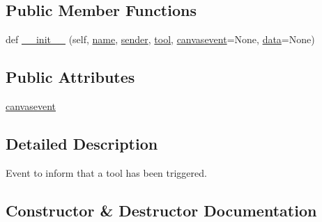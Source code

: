 \subsection*{Public Member Functions}
\begin{DoxyCompactItemize}
\item 
def \hyperlink{classmatplotlib_1_1backend__managers_1_1ToolTriggerEvent_a3457ac502525a7afa259c1ef144efe81}{\+\_\+\+\_\+init\+\_\+\+\_\+} (self, \hyperlink{classmatplotlib_1_1backend__managers_1_1ToolEvent_a911e0e0aa3846d264fcf064a3b7b887d}{name}, \hyperlink{classmatplotlib_1_1backend__managers_1_1ToolEvent_a00635a362e6b1ad9e98be07804cb77a0}{sender}, \hyperlink{classmatplotlib_1_1backend__managers_1_1ToolEvent_a29cbd299e8a363ba74f8fcd50175b51e}{tool}, \hyperlink{classmatplotlib_1_1backend__managers_1_1ToolTriggerEvent_a3197c069e8d074b0a1c9626cefa14af1}{canvasevent}=None, \hyperlink{classmatplotlib_1_1backend__managers_1_1ToolEvent_a26c96380714e79bad2d447ebc80ec6e3}{data}=None)
\end{DoxyCompactItemize}
\subsection*{Public Attributes}
\begin{DoxyCompactItemize}
\item 
\hyperlink{classmatplotlib_1_1backend__managers_1_1ToolTriggerEvent_a3197c069e8d074b0a1c9626cefa14af1}{canvasevent}
\end{DoxyCompactItemize}


\subsection{Detailed Description}
\begin{DoxyVerb}Event to inform that a tool has been triggered.\end{DoxyVerb}
 

\subsection{Constructor \& Destructor Documentation}
\mbox{\label{classmatplotlib_1_1backend__managers_1_1ToolTriggerEvent_a3457ac502525a7afa259c1ef144efe81}} 
